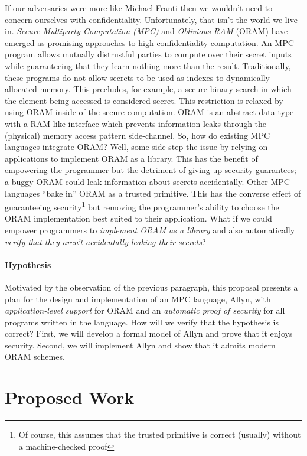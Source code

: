 \documentclass{report}
\newcommand{\lang}{Allyn\xspace}
\begin{document}
If our adversaries were more like Michael Franti then we wouldn't need to concern ourselves with confidentiality.
Unfortunately, that isn't the world we live in. \emph{Secure Multiparty Computation (MPC)} and \emph{Oblivious RAM} (ORAM)
have emerged as promising approaches to high-confidentiality computation. An MPC program allows mutually distrustful
parties to compute over their secret inputs while guaranteeing that they learn nothing more than the result.
Traditionally, these programs do not allow secrets to be used as indexes to dynamically allocated memory.
This precludes, for example, a secure binary search in which the element being accessed is considered secret.
This restriction is relaxed by using ORAM inside of the secure computation. ORAM is an abstract data type with a
RAM-like interface which prevents information leaks through the (physical) memory access pattern side-channel.
So, how do existing MPC languages integrate ORAM? Well, some side-step the issue by relying on applications
to implement ORAM as a library. This has the benefit of empowering the programmer but the detriment of
giving up security guarantees; a buggy ORAM could leak information about secrets accidentally.
Other MPC languages ``bake in'' ORAM as a trusted primitive. This has the converse effect of guaranteeing
security\footnote{Of course, this assumes that the trusted primitive is correct (usually) without a machine-checked proof}
but removing the programmer's ability to choose the ORAM implementation best suited to their application.
What if we could empower programmers to \emph{implement ORAM as a library} and also automatically
\emph{verify that they aren't accidentally leaking their secrets}?

\paragraph{Hypothesis} Motivated by the observation of the previous paragraph, this proposal presents a plan
for the design and implementation of an MPC language, \lang, with \emph{application-level support} for ORAM and an
\emph{automatic proof of security} for all programs written in the language. How will we verify that the hypothesis is correct?
First, we will develop a formal model of \lang and prove that it enjoys security.
Second, we will implement \lang and show that it admits modern ORAM schemes.

\section{Proposed Work}
\end{document}
